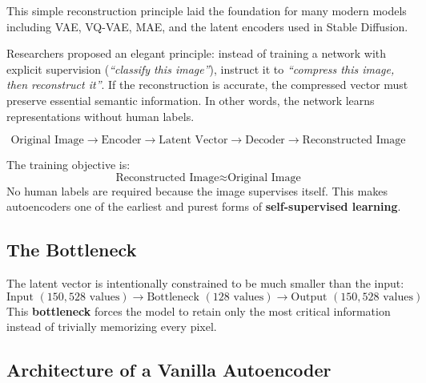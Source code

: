 This simple reconstruction principle laid the foundation for many modern models including VAE, VQ-VAE, MAE, and the latent encoders used in Stable Diffusion.

Researchers proposed an elegant principle: instead of training a network with explicit supervision (\emph{``classify this image''}), instruct it to \emph{``compress this image, then reconstruct it''}. If the reconstruction is accurate, the compressed vector must preserve essential semantic information. In other words, the network learns representations without human labels.

\[
\text{Original Image} \longrightarrow \text{Encoder} \longrightarrow \text{Latent Vector} \longrightarrow \text{Decoder} \longrightarrow \text{Reconstructed Image}
\]

The training objective is:
\[
\text{Reconstructed Image} \approx \text{Original Image}
\]
No human labels are required because the image supervises itself. This makes autoencoders one of the earliest and purest forms of \textbf{self-supervised learning}.

\subsection{The Bottleneck}
The latent vector is intentionally constrained to be much smaller than the input:
\[
\text{Input } (150,528 \text{ values}) \longrightarrow \text{Bottleneck } (128 \text{ values}) \longrightarrow \text{Output } (150,528 \text{ values})
\]
This \textbf{bottleneck} forces the model to retain only the most critical information instead of trivially memorizing every pixel.

\subsection{Architecture of a Vanilla Autoencoder}


